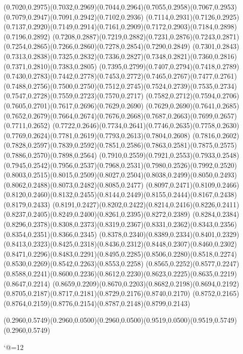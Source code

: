 (0.7020,0.2975)(0.7032,0.2969)(0.7044,0.2964)(0.7055,0.2958)(0.7067,0.2953)(0.7079,0.2947)(0.7091,0.2942)(0.7102,0.2936)
(0.7114,0.2931)(0.7126,0.2925)(0.7137,0.2920)(0.7149,0.2914)(0.7161,0.2909)(0.7172,0.2903)(0.7184,0.2898)(0.7196,0.2892)
(0.7208,0.2887)(0.7219,0.2882)(0.7231,0.2876)(0.7243,0.2871)(0.7254,0.2865)(0.7266,0.2860)(0.7278,0.2854)(0.7290,0.2849)
(0.7301,0.2843)(0.7313,0.2838)(0.7325,0.2832)(0.7336,0.2827)(0.7348,0.2821)(0.7360,0.2816)(0.7371,0.2810)(0.7383,0.2805)
(0.7395,0.2799)(0.7407,0.2794)(0.7418,0.2789)(0.7430,0.2783)(0.7442,0.2778)(0.7453,0.2772)(0.7465,0.2767)(0.7477,0.2761)
(0.7488,0.2756)(0.7500,0.2750)(0.7512,0.2745)(0.7524,0.2739)(0.7535,0.2734)(0.7547,0.2728)(0.7559,0.2723)(0.7570,0.2717)
(0.7582,0.2712)(0.7594,0.2706)(0.7605,0.2701)(0.7617,0.2696)(0.7629,0.2690)
\PST@Solid(0.7629,0.2690)(0.7641,0.2685)(0.7652,0.2679)(0.7664,0.2674)(0.7676,0.2668)(0.7687,0.2663)(0.7699,0.2657)(0.7711,0.2652)
(0.7722,0.2646)(0.7734,0.2641)(0.7746,0.2635)(0.7758,0.2630)(0.7769,0.2624)(0.7781,0.2619)(0.7793,0.2613)(0.7804,0.2608)
(0.7816,0.2602)(0.7828,0.2597)(0.7839,0.2592)(0.7851,0.2586)(0.7863,0.2581)(0.7875,0.2575)(0.7886,0.2570)(0.7898,0.2564)
(0.7910,0.2559)(0.7921,0.2553)(0.7933,0.2548)(0.7945,0.2542)(0.7956,0.2537)(0.7968,0.2531)(0.7980,0.2526)(0.7992,0.2520)
(0.8003,0.2515)(0.8015,0.2509)(0.8027,0.2504)(0.8038,0.2499)(0.8050,0.2493)(0.8062,0.2488)(0.8073,0.2482)(0.8085,0.2477)
(0.8097,0.2471)(0.8109,0.2466)(0.8120,0.2460)(0.8132,0.2455)(0.8144,0.2449)(0.8155,0.2444)(0.8167,0.2438)(0.8179,0.2433)
(0.8191,0.2427)(0.8202,0.2422)(0.8214,0.2416)(0.8226,0.2411)(0.8237,0.2405)(0.8249,0.2400)(0.8261,0.2395)(0.8272,0.2389)
(0.8284,0.2384)(0.8296,0.2378)(0.8308,0.2373)(0.8319,0.2367)(0.8331,0.2362)(0.8343,0.2356)(0.8354,0.2351)(0.8366,0.2345)
(0.8378,0.2340)(0.8389,0.2334)(0.8401,0.2329)(0.8413,0.2323)(0.8425,0.2318)(0.8436,0.2312)(0.8448,0.2307)(0.8460,0.2302)
(0.8471,0.2296)(0.8483,0.2291)(0.8495,0.2285)(0.8506,0.2280)(0.8518,0.2274)(0.8530,0.2269)(0.8542,0.2263)(0.8553,0.2258)
(0.8565,0.2252)(0.8577,0.2247)(0.8588,0.2241)(0.8600,0.2236)(0.8612,0.2230)(0.8623,0.2225)(0.8635,0.2219)(0.8647,0.2214)
(0.8659,0.2209)(0.8670,0.2203)(0.8682,0.2198)(0.8694,0.2192)(0.8705,0.2187)(0.8717,0.2181)(0.8729,0.2176)(0.8740,0.2170)
(0.8752,0.2165)(0.8764,0.2159)(0.8776,0.2154)(0.8787,0.2148)(0.8799,0.2143)



\PST@Solid(0.2960,0.5749)(0.2960,0.0500)\PST@Solid(0.2960,0.0500)(0.9519,0.0500)(0.9519,0.5749)(0.2960,0.5749)

\catcode`@=12
\fi
\endpspicture
